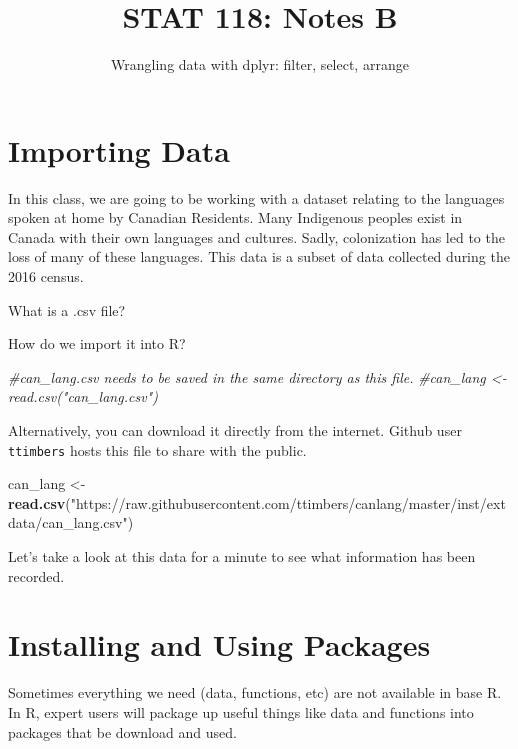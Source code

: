 \documentclass[
]{article}
\title{STAT 118: Notes B}
\subtitle{Wrangling data with dplyr: filter, select, arrange}
\author{}
\date{\vspace{-2.5em}}
\newenvironment{Shaded}{\begin{snugshade}}{\end{snugshade}}
\newcommand{\CommentTok}[1]{\textcolor[rgb]{0.56,0.35,0.01}{\textit{#1}}}
\newcommand{\FunctionTok}[1]{\textcolor[rgb]{0.13,0.29,0.53}{\textbf{#1}}}
\newcommand{\NormalTok}[1]{#1}
\newcommand{\OtherTok}[1]{\textcolor[rgb]{0.56,0.35,0.01}{#1}}
\newcommand{\StringTok}[1]{\textcolor[rgb]{0.31,0.60,0.02}{#1}}
\begin{document}
\maketitle

\hypertarget{importing-data}{%
\section{Importing Data}\label{importing-data}}

In this class, we are going to be working with a dataset relating to the
languages spoken at home by Canadian Residents. Many Indigenous peoples
exist in Canada with their own languages and cultures. Sadly,
colonization has led to the loss of many of these languages. This data
is a subset of data collected during the 2016 census.

What is a .csv file?

How do we import it into R?

\begin{Shaded}
\begin{Highlighting}[]
\CommentTok{\#can\_lang.csv needs to be saved in the same directory as this file. }
\CommentTok{\#can\_lang \textless{}{-} read.csv("can\_lang.csv")}
\end{Highlighting}
\end{Shaded}

Alternatively, you can download it directly from the internet. Github
user \texttt{ttimbers} hosts this file to share with the public.

\begin{Shaded}
\begin{Highlighting}[]
\NormalTok{can\_lang }\OtherTok{\textless{}{-}} \FunctionTok{read.csv}\NormalTok{(}\StringTok{"https://raw.githubusercontent.com/ttimbers/canlang/master/inst/extdata/can\_lang.csv"}\NormalTok{)}
\end{Highlighting}
\end{Shaded}

Let's take a look at this data for a minute to see what information has
been recorded.

\hypertarget{installing-and-using-packages}{%
\section{Installing and Using
Packages}\label{installing-and-using-packages}}

Sometimes everything we need (data, functions, etc) are not available in
base R. In R, expert users will package up useful things like data and
functions into packages that be download and used.
\end{document}
